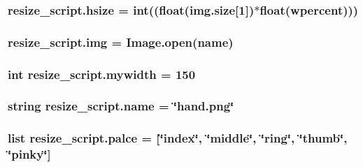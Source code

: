 \subsubsection[{\texorpdfstring{hsize}{hsize}}]{\setlength{\rightskip}{0pt plus 5cm}resize\+\_\+script.\+hsize = int((float(img.\+size\mbox{[}1\mbox{]})$\ast$float({\bf wpercent})))}\hypertarget{namespaceresize__script_a51a5f5ec3dcaae321e76c4b8f46f6134}{}\label{namespaceresize__script_a51a5f5ec3dcaae321e76c4b8f46f6134}
\subsubsection[{\texorpdfstring{img}{img}}]{\setlength{\rightskip}{0pt plus 5cm}resize\+\_\+script.\+img = Image.\+open({\bf name})}\hypertarget{namespaceresize__script_abdb2b972c6c1f9e70d543a0a16e25463}{}\label{namespaceresize__script_abdb2b972c6c1f9e70d543a0a16e25463}
\subsubsection[{\texorpdfstring{mywidth}{mywidth}}]{\setlength{\rightskip}{0pt plus 5cm}int resize\+\_\+script.\+mywidth = 150}\hypertarget{namespaceresize__script_ae7ea66b65845ff6b9478a056a4a33c5a}{}\label{namespaceresize__script_ae7ea66b65845ff6b9478a056a4a33c5a}
\subsubsection[{\texorpdfstring{name}{name}}]{\setlength{\rightskip}{0pt plus 5cm}string resize\+\_\+script.\+name = \char`\"{}hand.\+png\char`\"{}}\hypertarget{namespaceresize__script_aac9c9cf9b8d89c7b8f9634beed5e1ff4}{}\label{namespaceresize__script_aac9c9cf9b8d89c7b8f9634beed5e1ff4}
\subsubsection[{\texorpdfstring{palce}{palce}}]{\setlength{\rightskip}{0pt plus 5cm}list resize\+\_\+script.\+palce = \mbox{[}\char`\"{}index\char`\"{}, \char`\"{}middle\char`\"{}, \char`\"{}ring\char`\"{}, \char`\"{}thumb\char`\"{}, \char`\"{}pinky\char`\"{}\mbox{]}}\hypertarget{namespaceresize__script_a5ee40d78c225215ab3915db1fbd7e83f}{}\label{namespaceresize__script_a5ee40d78c225215ab3915db1fbd7e83f}
